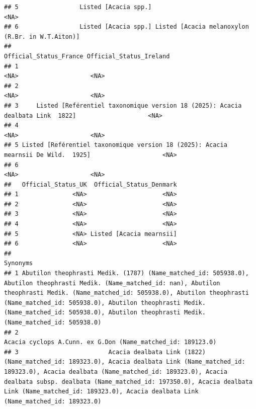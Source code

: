 \documentclass[
]{article}
\begin{document}
\begin{verbatim}
## 5                 Listed [Acacia spp.]                                             <NA>
## 6                 Listed [Acacia spp.] Listed [Acacia melanoxylon (R.Br. in W.T.Aiton)]
##                                                               Official_Status_France Official_Status_Ireland
## 1                                                                               <NA>                    <NA>
## 2                                                                               <NA>                    <NA>
## 3     Listed [Reférentiel taxonomique version 18 (2025): Acacia dealbata Link  1822]                    <NA>
## 4                                                                               <NA>                    <NA>
## 5 Listed [Reférentiel taxonomique version 18 (2025): Acacia mearnsii De Wild.  1925]                    <NA>
## 6                                                                               <NA>                    <NA>
##   Official_Status_UK  Official_Status_Denmark
## 1               <NA>                     <NA>
## 2               <NA>                     <NA>
## 3               <NA>                     <NA>
## 4               <NA>                     <NA>
## 5               <NA> Listed [Acacia mearnsii]
## 6               <NA>                     <NA>
##                                                                                                                                                                                                                                                                                                                                          Synonyms
## 1 Abutilon theophrasti Medik. (1787) (Name_matched_id: 505938.0), Abutilon theophrasti Medik. (Name_matched_id: nan), Abutilon theophrasti Medik. (Name_matched_id: 505938.0), Abutilon theophrasti (Name_matched_id: 505938.0), Abutilon theophrasti Medik. (Name_matched_id: 505938.0), Abutilon theophrasti Medik. (Name_matched_id: 505938.0)
## 2                                                                                                                                                                                                                                                                                     Acacia cyclops A.Cunn. ex G.Don (Name_matched_id: 189123.0)
## 3                         Acacia dealbata Link (1822) (Name_matched_id: 189323.0), Acacia dealbata Link (Name_matched_id: 189323.0), Acacia dealbata (Name_matched_id: 189323.0), Acacia dealbata subsp. dealbata (Name_matched_id: 197350.0), Acacia dealbata Link (Name_matched_id: 189323.0), Acacia dealbata Link (Name_matched_id: 189323.0)

\end{verbatim}
\end{document}
